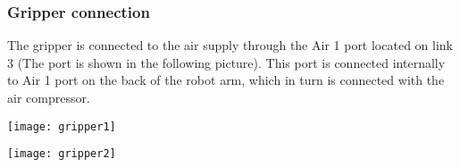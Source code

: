  		\subsubsection{Gripper connection}
 		The gripper is connected to the air supply through the Air 1 port located on link 3 (The port is shown in the following picture). This port is connected internally to Air 1 port on the back of the robot arm, which in turn is connected with the air compressor.
 		\newline
 			\begin{minipage}{0.5\textwidth}	
 			\texttt{[image: gripper1]}
 		\end{minipage} \hfill
 		\begin{minipage}{0.6\textwidth}
 			\texttt{[image: gripper2]}
 		\end{minipage}
 		

